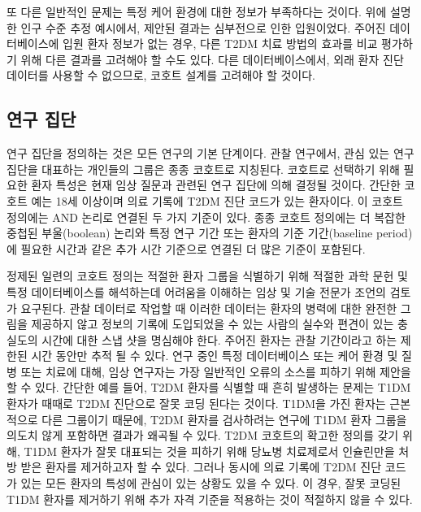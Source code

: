 \documentclass[11pt]{book}
\theoremstyle{definition}
\theoremstyle{definition}
\theoremstyle{definition}
\theoremstyle{remark}
\begin{document}
또 다른 일반적인 문제는 특정 케어 환경에 대한 정보가 부족하다는 것이다.
위에 설명한 인구 수준 추정 예시에서, 제안된 결과는 심부전으로 인한
입원이었다. 주어진 데이터베이스에 입원 환자 정보가 없는 경우, 다른 T2DM
치료 방법의 효과를 비교 평가하기 위해 다른 결과를 고려해야 할 수도 있다.
다른 데이터베이스에서, 외래 환자 진단 데이터를 사용할 수 없으므로,
코호트 설계를 고려해야 할 것이다.

\subsection{연구 집단}\label{--1}

연구 집단을 정의하는 것은 모든 연구의 기본 단계이다. 관찰 연구에서, 관심
있는 연구 집단을 대표하는 개인들의 그룹은 종종 코호트로 지칭된다.
코호트로 선택하기 위해 필요한 환자 특성은 현재 임상 질문과 관련된 연구
집단에 의해 결정될 것이다. 간단한 코호트 예는 18세 이상이며 의료 기록에
T2DM 진단 코드가 있는 환자이다. 이 코호트 정의에는 AND 논리로 연결된 두
가지 기준이 있다. 종종 코호트 정의에는 더 복잡한 중첩된 부울(boolean)
논리와 특정 연구 기간 또는 환자의 기준 기간(baseline period)에 필요한
시간과 같은 추가 시간 기준으로 연결된 더 많은 기준이 포함된다.

정제된 일련의 코호트 정의는 적절한 환자 그룹을 식별하기 위해 적절한 과학
문헌 및 특정 데이터베이스를 해석하는데 어려움을 이해하는 임상 및 기술
전문가 조언의 검토가 요구된다. 관찰 데이터로 작업할 때 이러한 데이터는
환자의 병력에 대한 완전한 그림을 제공하지 않고 정보의 기록에 도입되었을
수 있는 사람의 실수와 편견이 있는 충실도의 시간에 대한 스냅 샷을
명심해야 한다. 주어진 환자는 관찰 기간이라고 하는 제한된 시간 동안만
추적 될 수 있다. 연구 중인 특정 데이터베이스 또는 케어 환경 및 질병 또는
치료에 대해, 임상 연구자는 가장 일반적인 오류의 소스를 피하기 위해
제안을 할 수 있다. 간단한 예를 들어, T2DM 환자를 식별할 때 흔히 발생하는
문제는 T1DM 환자가 때때로 T2DM 진단으로 잘못 코딩 된다는 것이다. T1DM을
가진 환자는 근본적으로 다른 그룹이기 때문에, T2DM 환자를 검사하려는
연구에 T1DM 환자 그룹을 의도치 않게 포함하면 결과가 왜곡될 수 있다. T2DM
코호트의 확고한 정의를 갖기 위해, T1DM 환자가 잘못 대표되는 것을 피하기
위해 당뇨병 치료제로서 인슐린만을 처방 받은 환자를 제거하고자 할 수
있다. 그러나 동시에 의료 기록에 T2DM 진단 코드가 있는 모든 환자의 특성에
관심이 있는 상황도 있을 수 있다. 이 경우, 잘못 코딩된 T1DM 환자를
제거하기 위해 추가 자격 기준을 적용하는 것이 적절하지 않을 수 있다.
\end{document}

